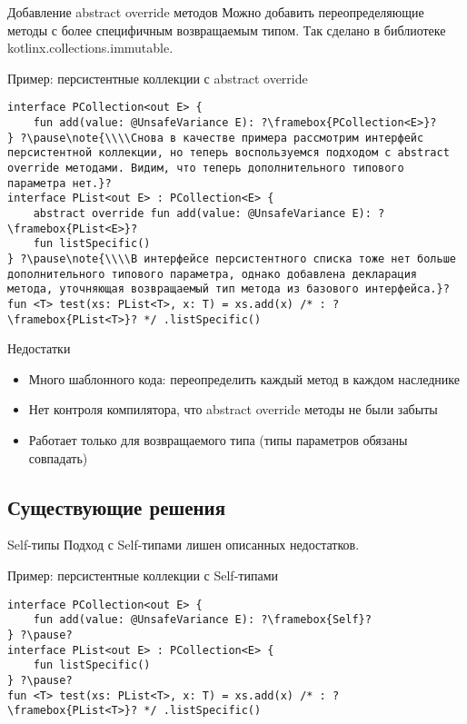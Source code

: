 \documentclass[handout,aspectratio=169,usenames,dvipsnames]{beamer}
\begin{document}
    \begin{frame}[fragile]{Добавление abstract override методов}
        Можно добавить переопределяющие методы с более специфичным возвращаемым типом.
        Так сделано в библиотеке kotlinx.collections.immutable.
        \pause
        \begin{block}{Пример: персистентные коллекции с abstract override}
            \begin{verbatim}
interface PCollection<out E> {
    fun add(value: @UnsafeVariance E): ?\framebox{PCollection<E>}?
} ?\pause\note{\\\\Снова в качестве примера рассмотрим интерфейс персистентной коллекции, но теперь воспользуемся подходом с abstract override методами. Видим, что теперь дополнительного типового параметра нет.}?
interface PList<out E> : PCollection<E> {
    abstract override fun add(value: @UnsafeVariance E): ?\framebox{PList<E>}?
    fun listSpecific()
} ?\pause\note{\\\\В интерфейсе персистентного списка тоже нет больше дополнительного типового параметра, однако добавлена декларация метода, уточняющая возвращаемый тип метода из базового интерфейса.}?
fun <T> test(xs: PList<T>, x: T) = xs.add(x) /* : ?\framebox{PList<T>}? */ .listSpecific()
            \end{verbatim}
        \end{block}
        \pause
        \begin{block}{Недостатки}
            \begin{itemize}
                \item Много шаблонного кода: переопределить каждый метод в каждом наследнике
                \item Нет контроля компилятора, что abstract override методы не были забыты
                \item Работает только для возвращаемого типа (типы параметров обязаны совпадать)
            \end{itemize}
        \end{block}
    \end{frame}

    \subsection{Существующие решения}

    \begin{frame}[fragile]{Self-типы}
        Подход с Self-типами лишен описанных недостатков.
        \begin{block}{Пример: персистентные коллекции с Self-типами}
            \begin{verbatim}
interface PCollection<out E> {
    fun add(value: @UnsafeVariance E): ?\framebox{Self}?
} ?\pause?
interface PList<out E> : PCollection<E> {
    fun listSpecific()
} ?\pause?
fun <T> test(xs: PList<T>, x: T) = xs.add(x) /* : ?\framebox{PList<T>}? */ .listSpecific()
            \end{verbatim}
        \end{block}
    \end{frame}
\end{document}
